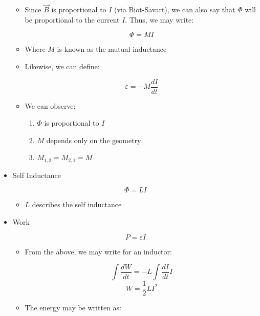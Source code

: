 \begin{itemize}
    \begin{itemize}

      \item Since $\vec{B}$ is proportional to $I$ (via Biot-Savart), we can also say that $\Phi$ will be proportional to the current $I$. Thus, we may write:

        $$\Phi=MI$$

      \item Where $M$ is known as the mutual inductance

      \item Likewise, we can define:

        $$\varepsilon=-M\frac{dI}{dt}$$

      \item We can observe:

        \begin{enumerate}

          \item $\Phi$ is proportional to $I$

          \item $M$ depends only on the geometry

          \item $M_{1,2}=M_{2,1}=M$

        \end{enumerate}

    \end{itemize}

  \item Self Inductance

    $$\Phi=LI$$

    \begin{itemize}

      \item $L$ describes the self inductance

    \end{itemize}

  \item Work

    $$P=\varepsilon I$$

    \begin{itemize}

      \item From the above, we may write for an inductor:

        $$\int \frac{dW}{dt}=-L\int\frac{dI}{dt}I$$
        $$W=\frac{1}{2}LI^2$$

      \item The energy may be written as:
        

\end{itemize}
\end{itemize}

